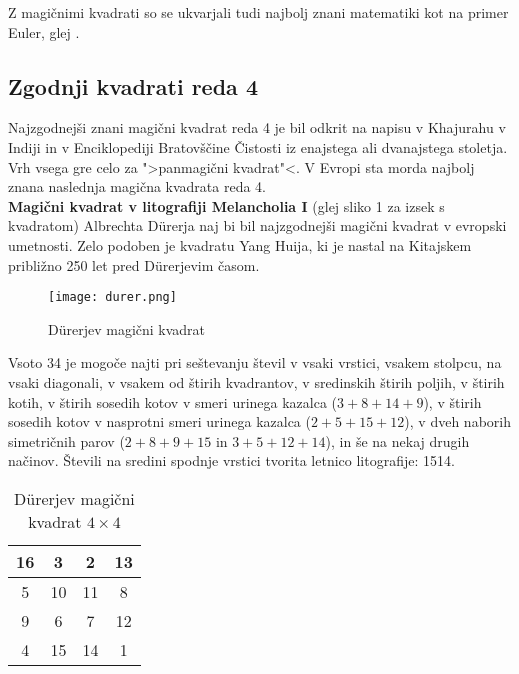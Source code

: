 \documentclass[a4paper,12pt]{article}
\begin{document}
Z magičnimi kvadrati so se ukvarjali tudi najbolj znani matematiki kot na
primer Euler, glej \cite{euler}. %


\subsection{Zgodnji kvadrati reda 4}

Najzgodnejši znani magični kvadrat reda 4 je bil odkrit na napisu
v Khajurahu v Indiji in v Enciklopediji Bratovščine Čistosti iz enajstega
ali dvanajstega stoletja. Vrh vsega gre celo za ">panmagični kvadrat"<.
V Evropi sta morda najbolj znana naslednja magična kvadrata reda 4.\\


\textbf{Magični kvadrat v litografiji Melancholia I }(glej sliko 1
za izsek s kvadratom) Albrechta Dürerja naj bi bil najzgodnejši magični kvadrat
v evropski umetnosti. Zelo podoben je kvadratu Yang Huija, ki je nastal na Kitajskem
približno 250 let pred Dürerjevim časom. %

\begin{figure}[!ht]
   \centering
   \caption{Dürerjev magični kvadrat}
   \label{fig:durer}
   \texttt{[image: durer.png]}
\end{figure}


Vsoto 34 je mogoče najti pri seštevanju števil v vsaki vrstici, vsakem stolpcu,
na vsaki diagonali, v vsakem od štirih kvadrantov, v sredinskih štirih poljih,
v štirih kotih, v štirih sosedih kotov v smeri urinega kazalca ($3+8+14+9$), v
štirih sosedih kotov v nasprotni smeri urinega kazalca ($2+5+15+12$), v dveh naborih
simetričnih parov ($2+8+9+15$ in $3+5+12+14$), in še na nekaj drugih načinov.
Števili na sredini spodnje vrstici tvorita letnico litografije: 1514.
%
\begin{table}[h]
   \centering
   \caption{Dürerjev magični kvadrat $4\times 4$}
   \label{table:durer}
   \begin{tabular}{|c|c|c|c|}
      \hline
      16 &  3 &  2 & 13\\
      \hline
      5 & 10 & 11 &  8 \\
      \hline
      9 &  6 &  7 & 12 \\
      \hline
      4 & 15 & 14 &  1 \\
      \hline

      
   \end{tabular}
   
\end{table}
\end{document}
